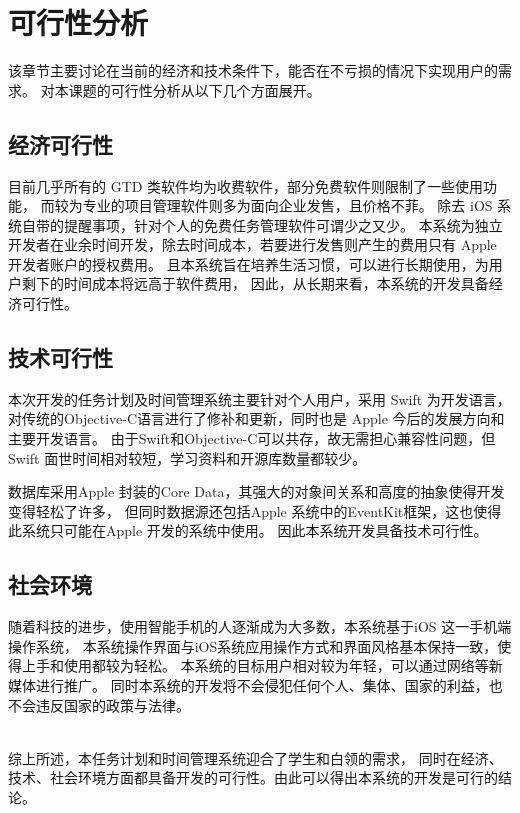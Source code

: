 \chapter{可行性分析}
该章节主要讨论在当前的经济和技术条件下，能否在不亏损的情况下实现用户的需求。
对本课题的可行性分析从以下几个方面展开。
\section{经济可行性}
目前几乎所有的 GTD 类软件均为收费软件，部分免费软件则限制了一些使用功能，
而较为专业的项目管理软件则多为面向企业发售，且价格不菲。
除去 iOS 系统自带的提醒事项，针对个人的免费任务管理软件可谓少之又少。
本系统为独立开发者在业余时间开发，除去时间成本，若要进行发售则产生的费用只有 Apple 开发者账户的授权费用。
且本系统旨在培养生活习惯，可以进行长期使用，为用户剩下的时间成本将远高于软件费用，
因此，从长期来看，本系统的开发具备经济可行性。

\section{技术可行性}
本次开发的任务计划及时间管理系统主要针对个人用户，采用 Swift 为开发语言，
对传统的Objective-C语言进行了修补和更新，同时也是 Apple 今后的发展方向和主要开发语言。
由于Swift和Objective-C可以共存，故无需担心兼容性问题，但 Swift 面世时间相对较短，学习资料和开源库数量都较少。

数据库采用Apple 封装的Core Data，其强大的对象间关系和高度的抽象使得开发变得轻松了许多，
但同时数据源还包括Apple 系统中的EventKit框架，这也使得此系统只可能在Apple 开发的系统中使用。
因此本系统开发具备技术可行性。

\section{社会环境}
随着科技的进步，使用智能手机的人逐渐成为大多数，本系统基于iOS 这一手机端操作系统，
本系统操作界面与iOS系统应用操作方式和界面风格基本保持一致，使得上手和使用都较为轻松。
本系统的目标用户相对较为年轻，可以通过网络等新媒体进行推广。
同时本系统的开发将不会侵犯任何个人、集体、国家的利益，也不会违反国家的政策与法律。

~\\

综上所述，本任务计划和时间管理系统迎合了学生和白领的需求，
同时在经济、技术、社会环境方面都具备开发的可行性。由此可以得出本系统的开发是可行的结论。